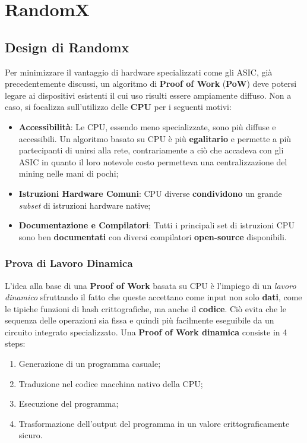 \chapter{RandomX}

\section{Design di Randomx}
Per minimizzare il vantaggio di hardware specializzati come gli ASIC, già precedentemente discussi, un algoritmo di \textbf{Proof of Work} (\textbf{PoW}) deve potersi legare ai dispositivi esistenti il cui uso risulti essere ampiamente diffuso. Non a caso, si focalizza sull'utilizzo delle \textbf{CPU} per i seguenti motivi:

\begin{itemize}
    \item \textbf{Accessibilità}: Le CPU, essendo meno specializzate, sono più diffuse e accessibili. Un algoritmo basato su CPU è più \textbf{egalitario} e permette a più partecipanti di unirsi alla rete, contrariamente a ciò che accadeva con gli ASIC in quanto il loro notevole costo permetteva una centralizzazione del mining nelle mani di pochi;
    \item \textbf{Istruzioni Hardware Comuni}: CPU diverse \textbf{condividono} un grande \textit{subset} di istruzioni hardware native;
    \item \textbf{Documentazione e Compilatori}: Tutti i principali set di istruzioni CPU sono ben \textbf{documentati} con diversi compilatori \textbf{open-source} disponibili.
\end{itemize}

\subsection{Prova di Lavoro Dinamica} 
L'idea alla base di una \textbf{Proof of Work} basata su CPU è l'impiego di un \textit{lavoro dinamico} sfruttando il fatto che queste accettano come input non solo \textbf{dati}, come le tipiche funzioni di hash crittografiche, ma anche il \textbf{codice}. Ciò evita che le sequenza delle operazioni sia fissa e quindi più facilmente eseguibile da un circuito integrato specializzato. Una \textbf{Proof of Work dinamica} consiste in 4 steps:
\begin{enumerate}
    \item Generazione di un programma casuale;
    \item Traduzione nel codice macchina nativo della CPU;
    \item Esecuzione del programma;
    \item Trasformazione dell'output del programma in un valore crittograficamente sicuro.
\end{enumerate}

